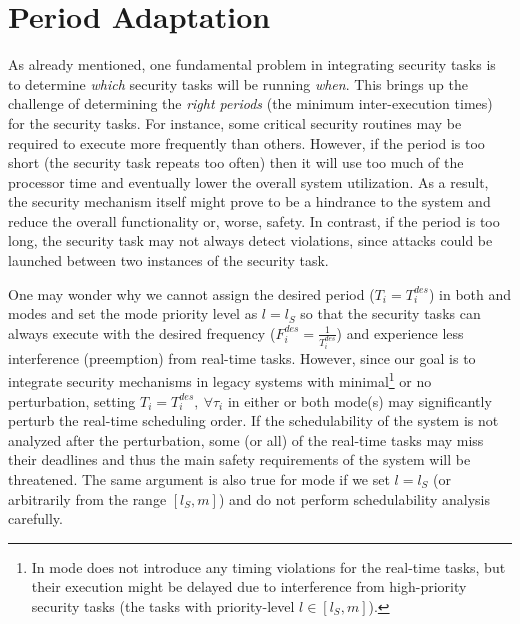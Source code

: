 \documentclass[../rt_server_main.tex]{subfiles}
\begin{document}
\section{Period Adaptation}
\label{sec:period_adapt}

As already mentioned, one fundamental problem in integrating security tasks is to determine \textit{which} security tasks will be running \textit{when}.
This brings up the challenge of determining the \textit{right periods} (\viz the minimum inter-execution times) for the security tasks. For instance, some critical security routines may be required to execute more frequently than others. However, if the period is too short (\eg the security task repeats too often) then it will use too much of the processor time and eventually lower the overall system utilization. As a result, the security mechanism itself might prove to be a hindrance to the system and reduce the overall functionality or, worse, safety. In contrast, if the period is too long, the security task may not always detect violations, since attacks could be launched between two instances of the security task.





One may wonder why we cannot assign the desired period (\eg $T_i = T_i^{des}$) in both \pve and \ave modes and set the \ave mode priority level  as $l = l_S$ so that  the security tasks can always execute with the desired frequency (\ie $F_i^{des} = \frac{1}{T_i^{des}}$) and experience less interference (\eg preemption) from real-time tasks. However, since our goal is to integrate security mechanisms in legacy systems with minimal\footnote{In \ave mode \coolname does not introduce any timing violations for the real-time tasks, but their execution might
be delayed due to interference from high-priority security tasks (\eg the tasks with priority-level $l \in [l_S, m]$).} or no perturbation, setting $T_i = T_i^{des}, ~\forall \tau_i$ in either or both mode(s) may significantly perturb the real-time scheduling order. If the schedulability of the system is not analyzed after the perturbation, some (or all) of the real-time tasks may miss their deadlines and thus the main safety requirements of the system will be threatened. The same argument is also true for \ave mode if we set $l = l_S$ (or arbitrarily from the range $[l_S, m]$)  and do not perform schedulability analysis carefully.
\end{document}
